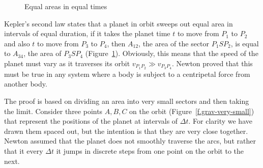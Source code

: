 \begin{figure}[tb]
\begin{minipage}{.5\textwidth}
\begin{center}
\caption{Equal areas in equal times}\label{f.grav-second}
\end{center}
\end{minipage}
\end{figure}


Kepler's second law states that a planet in orbit sweeps out equal area in intervals of equal duration, if it takes the planet time $t$ to move from $P_1$ to $P_2$ and also $t$ to move from $P_3$ to $P_4$, then $A_{12}$, the area of the sector $P_1SP_2$, is equal to $A_{34}$, the area of $P_3SP_4$ (Figure~\ref{f.grav-second}). Obviously, this means that the speed of the planet must vary as it traverses its orbit $v_{P_1P_2} \gg v_{P_3P_4}$. Newton proved that this must be true in any system where a body is subject to a centripetal force from another body. 

The proof is based on dividing an area into very small sectors and then taking the limit. Consider three points $A,B,C$ on the orbit (Figure~\ref{f.grav-very-small}) that represent the positions of the planet at intervals of $\Delta t$. For clarity we have drawn them spaced out, but the intention is that they are very close together. Newton assumed that the planet does not smoothly traverse the arcs, but rather that it every $\Delta t$ it jumps in discrete steps from one point on the orbit to the next.

